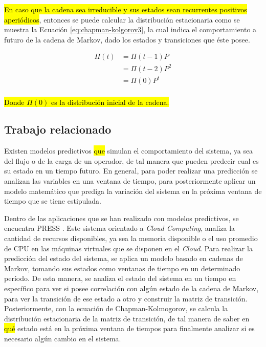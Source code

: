 \hl{En caso que la cadena sea irreducible y sus estados sean recurrentes positivos aperiódicos}, entonces se puede calcular la distribución estacionaria como se muestra la Ecuación \ref{eq:chapman-kolgorov3}, la cual indica el comportamiento a futuro de la cadena de Markov, dado los estados y transiciones que éste posee.

\begin{equation} \label{eq:chapman-kolgorov3}
\begin{split}
	\Pi (t) &= \Pi (t-1)P \\
				  &= \Pi (t-2)P^{2}\\
				  &= \Pi (0)P^{t}\\
\end{split}
\end{equation}

\hl{Donde $\Pi (0)$ es la distribución inicial de la cadena.}

\subsection{Trabajo relacionado}
\label{subSec:markovTrabajo}
Existen modelos predictivos \hl{que} simulan el comportamiento del sistema, ya sea del flujo o de la carga de un operador, de tal manera que pueden predecir cual es su estado en un tiempo futuro. En general, para poder realizar una predicción se analizan las variables en una ventana de tiempo, para posteriormente aplicar un modelo matemático que prediga la variación del sistema en la próxima ventana de tiempo que se tiene estipulada.

Dentro de las aplicaciones que se han realizado con modelos predictivos, se encuentra PRESS \citep{GongGW10}. Este sistema orientado a \textit{Cloud Computing}, analiza la cantidad de recursos disponibles, ya sea la memoria disponible o el uso promedio de CPU en las máquinas virtuales que se disponen en el \textit{Cloud}. Para realizar la predicción del estado del sistema, se aplica un modelo basado en cadenas de Markov, tomando sus estados como ventanas de tiempo en un determinado período. De esta manera, se analiza el estado del sistema en un tiempo en específico para ver si posee correlación con algún estado de la cadena de Markov, para ver la transición de ese estado a otro y construir la matriz de transición. Posteriormente, con la ecuación de Chapman-Kolmogorov, se calcula la distribución estacionaria de la matriz de transición, de tal manera de saber en \hl{qué} estado está en la próxima ventana de tiempos para finalmente analizar si es necesario algún cambio en el sistema.

